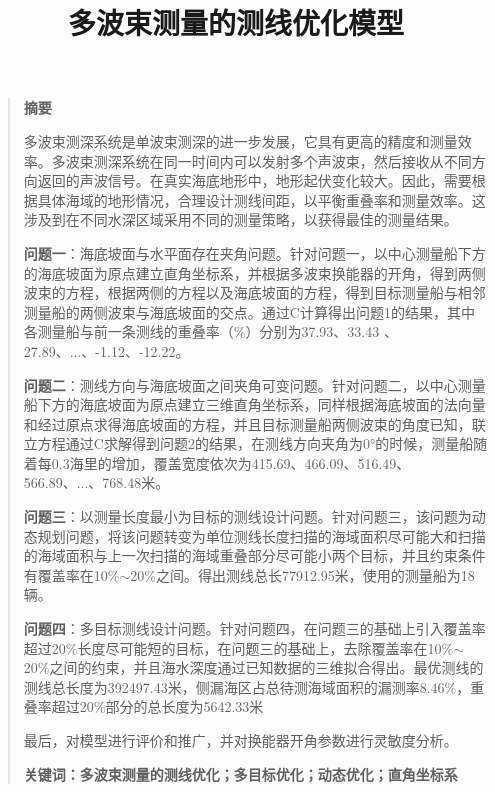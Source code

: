 \documentclass[12pt,a4paper]{article}
\begin{document}
		
		\title{\textbf{多波束测量的测线优化模型}\\[-2.5em]}
		\author{}
		\date{}
		\maketitle
		\thispagestyle{empty}
		\begin{quote}
			
			\begin{center}
				\textbf{摘要}\medskip
			\end{center}
			
			\hspace{1.75em} 多波束测深系统是单波束测深的进一步发展，它具有更高的精度和测量效率。多波束测深系统在同一时间内可以发射多个声波束，然后接收从不同方向返回的声波信号。在真实海底地形中，地形起伏变化较大。因此，需要根据具体海域的地形情况，合理设计测线间距，以平衡重叠率和测量效率。这涉及到在不同水深区域采用不同的测量策略，以获得最佳的测量结果。
			
			\hspace{1.75em}\textbf{问题一}：海底坡面与水平面存在夹角问题。针对问题一，以中心测量船下方的海底坡面为原点建立直角坐标系，并根据多波束换能器的开角，得到两侧波束的方程，根据两侧的方程以及海底坡面的方程，得到目标测量船与相邻测量船的两侧波束与海底坡面的交点。通过C计算得出问题1的结果，其中各测量船与前一条测线的重叠率（\%）分别为37.93、33.43 、27.89、...、-1.12、-12.22。
			
			\hspace{1.75em}\textbf{问题二}：测线方向与海底坡面之间夹角可变问题。针对问题二，以中心测量船下方的海底坡面为原点建立三维直角坐标系，同样根据海底坡面的法向量和经过原点求得海底坡面的方程，并且目标测量船两侧波束的角度已知，联立方程通过C求解得到问题2的结果，在测线方向夹角为0°的时候，测量船随着每0.3海里的增加，覆盖宽度依次为415.69、466.09、516.49、566.89、...、768.48米。
			
			\hspace{1.75em}\textbf{问题三}：以测量长度最小为目标的测线设计问题。针对问题三，该问题为动态规划问题，将该问题转变为单位测线长度扫描的海域面积尽可能大和扫描的海域面积与上一次扫描的海域重叠部分尽可能小两个目标，并且约束条件有覆盖率在10\%$\sim$20\%之间。得出测线总长77912.95米，使用的测量船为18辆。
			
			\hspace{1.75em}\textbf{问题四}：多目标测线设计问题。针对问题四，在问题三的基础上引入覆盖率超过20\%长度尽可能短的目标，在问题三的基础上，去除覆盖率在10\%$\sim$20\%之间的约束，并且海水深度通过已知数据的三维拟合得出。最优测线的测线总长度为392497.43米，侧漏海区占总待测海域面积的漏测率8.46\%，重叠率超过20\%部分的总长度为5642.33米
			
			\hspace{1.75em}最后，对模型进行评价和推广，并对换能器开角参数进行灵敏度分析。
			\bigskip
			
			\textbf{关键词：多波束测量的测线优化；多目标优化；动态优化；直角坐标系}
		\end{quote}
	\clearpage
	\setcounter{page}{1}
	
\end{document}
